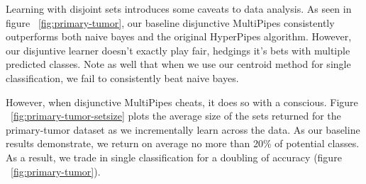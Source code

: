 Learning with disjoint sets introduces some caveats to data analysis. As seen in figure ~\ref{fig:primary-tumor}, our baseline disjunctive MultiPipes consistently outperforms both naive bayes and the original HyperPipes algorithm. However, our disjuntive learner doesn't exactly play fair, hedgings it's bets with multiple predicted classes. Note as well that when we use our centroid method for single classification, we fail to consistently beat naive bayes.

However, when disjunctive MultiPipes cheats, it does so with a conscious. Figure ~\ref{fig:primary-tumor-setsize} plots the average size of the sets returned for the primary-tumor dataset as we incrementally learn across the data. As our baseline results demonstrate, we return on average no more than 20\% of potential classes. As a result, we trade in single classification for a doubling of accuracy (figure ~\ref{fig:primary-tumor}).
